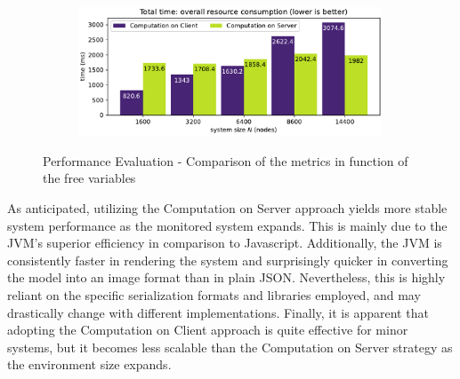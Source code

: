 \begin{center}
\begin{figure}[htb]
\begin{subfigure}[t]{0.45\textwidth}
		\end{subfigure}
		~
		\begin{subfigure}[t]{0.45\textwidth}
			\includegraphics[width=0.99\textwidth]{figures/total-time}
		\end{subfigure}
		\caption{Performance Evaluation - Comparison of the metrics in function of the free variables}
		\label{fig:performace-graphs}
	\end{figure}
\end{center}

As anticipated, utilizing the Computation on Server approach yields more stable system performance as the monitored system expands. This is mainly due to the JVM's superior efficiency in comparison to Javascript. Additionally, the JVM is consistently faster in rendering the system and surprisingly quicker in converting the model into an image format than in plain JSON. Nevertheless, this is highly reliant on the specific serialization formats and libraries employed, and may drastically change with different implementations. Finally, it is apparent that adopting the Computation on Client approach is quite effective for minor systems, but it becomes less scalable than the Computation on Server strategy as the environment size expands.
